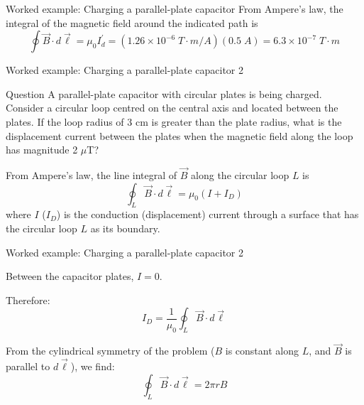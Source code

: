 {\begin{frame}{Worked example: Charging a parallel-plate capacitor}
   From Ampere's law, the integral of the magnetic field around the indicated path is
   \begin{equation*}
      \oint \vec{B} \cdot d\vec{\ell}
         = \mu_0 I_d^\prime
         = (1.26 \times 10^{-6} \; T \cdot m / A) (0.5 \; A)
         = 6.3 \times 10^{-7} \; T \cdot m
   \end{equation*}

\end{frame}

} %


%
%

{
\problemslide

%
%
%

\begin{frame}{Worked example: Charging a parallel-plate capacitor 2}

  \begin{blockexmplque}{Question}
    A parallel-plate capacitor with circular plates is being charged.
    Consider a circular loop centred on the central axis and located between
    the plates. If the loop radius of 3 cm is greater than the plate radius,
    what is the displacement current between the plates when the magnetic
    field along the loop has magnitude 2 $\mu$T?
  \end{blockexmplque}

  From Ampere's law, the line integral of $\vec{B}$ along the
  circular loop $L$ is
  \begin{equation*}
    \oint_{L} \vec{B} \cdot d\vec{\ell} = \mu_0 (I + I_D)
  \end{equation*}
  where $I$ ($I_D$) is the conduction (displacement)
  current through a surface that has the
  circular loop $L$ as its boundary.

\end{frame}

%
%
%

\begin{frame}{Worked example: Charging a parallel-plate capacitor 2}

  Between the capacitor plates, $I=0$.

  Therefore:
  \begin{equation*}
    I_D = \frac{1}{\mu_0} \oint_{L} \vec{B} \cdot d\vec{\ell}
  \end{equation*}

  From the cylindrical symmetry of the problem ($B$ is constant along $L$,
  and $\vec{B}$ is parallel to $d\vec{\ell}$), we find:
  \begin{equation*}
    \oint_{L} \vec{B} \cdot d\vec{\ell} = 2\pi r B
  \end{equation*}


\end{frame}}
